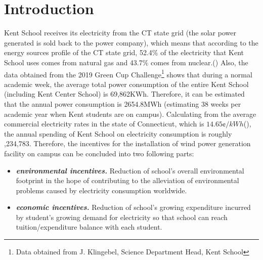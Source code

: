 \documentclass[review]{elsarticle}
\begin{document}
\section{Introduction}
\label{sec:Introduction}
Kent School receives its electricity from the CT state grid (the solar power generated is sold back to the power company), which means 
that according to the energy sources profile of the CT state grid, 52.4\% of the electricity that Kent School uses comes from natural 
gas and 43.7\% comes from nuclear.(\cite{u.s._energy_information_administration_2019}) Also, the data obtained from the 2019 Green Cup 
Challenge\footnote{Data obtained from J. Klingebel, Science Department Head, Kent School} shows that during a normal academic week, the 
average total power consumption of the entire Kent School (including Kent Center School) is 69,862KWh. Therefore, it can be estimated 
that the annual power consumption is 2654.8MWh (estimating 38 weeks per academic year when Kent students are on campus). Calculating 
from the average commercial electricity rates in the state of Connecticut, which is $14.65\cent/kWh$(\cite{u.s._energy_information_administration_2019}), 
the annual spending of Kent School on electricity consumption is roughly ,234,783. Therefore, the incentives for the 
installation of wind power generation facility on campus can be concluded into two following parts:
\begin{itemize}
    \item \textit{\textbf{environmental incentives.}} Reduction of school's overall environmental footprint in the hope of contributing to the alleviation of environmental 
    problems caused by electricity consumption worldwide.
    \item \textit{\textbf{economic incentives.}} Reduction of school's growing expenditure incurred by student's growing demand for electricity so that school can reach 
    tuition/expenditure balance with each student.
\end{itemize}
\end{document}
